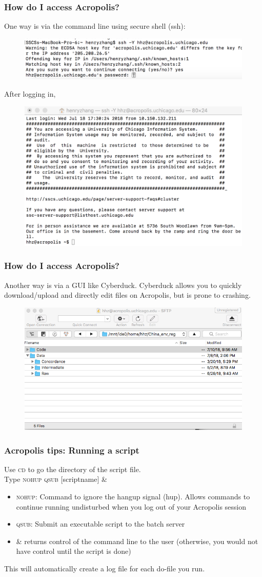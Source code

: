 \documentclass{beamer}
\newcommand{\bi}{\begin{itemize}}
\newcommand{\ei}{\end{itemize}}
\begin{document}
\begin{frame}
	\frametitle{How do I access Acropolis?}
	\small{One way is via the command line using secure shell (ssh):}
	\begin{figure}
		\includegraphics[width=0.6\linewidth]{ssh}
	\end{figure}
	\small{After logging in,}
	\begin{figure}
		\includegraphics[width=0.6\linewidth]{ssh_acropolis}
	\end{figure}
\end{frame}

\begin{frame}
	\frametitle{How do I access Acropolis?}
	Another way is via a GUI like Cyberduck. Cyberduck allows you to quickly download/upload and directly edit files on Acropolis, but is prone to crashing.
	\begin{figure}
		\includegraphics[width=0.6\linewidth]{cyberduck}
	\end{figure}	
\end{frame}


\begin{frame}
	\frametitle{Acropolis tips: Running a script}
	Use \textsc{cd} to go the directory of the script file. 
	\\
	Type \textsc{nohup qsub} [scriptname] \&
	\bi
		\item \textsc{nohup}: Command to ignore the hangup signal (hup). Allows commands to continue running undisturbed when you log out of your Acropolis session
		\item \textsc{qsub}: Submit an executable script to the batch server
		\item \& returns control of the command line to the user (otherwise, you would not have control until the script is done)
	\ei
	This will automatically create a log file for each do-file you run. 
\end{frame}
\end{document}
